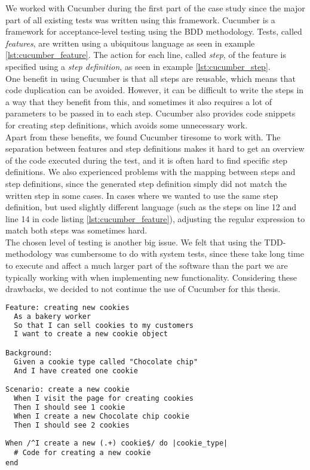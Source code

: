 
We worked with Cucumber during the first part of the case study since
the major part of all existing tests was written using this framework.
Cucumber is a framework for acceptance-level testing using the BDD
methodology. Tests, called \emph{features}, are written using a
ubiquitous language as seen in example \ref{lst:cucumber_feature}. The
action for each line, called \emph{step}, of the feature is specified
using a \emph{step definition}, as seen in example
\ref{lst:cucumber_step}. \cite{web:cucumber}\\

One benefit in using Cucumber is that all steps are reusable, which
means that code duplication can be avoided. However, it can be difficult
to write the steps in a way that they benefit from this, and sometimes
it also requires a lot of parameters to be passed in to each step.
Cucumber also provides code snippets for creating step definitions,
which avoids some unnecessary work.\\

Apart from these benefits, we found Cucumber tiresome to work with. The
separation between features and step definitions makes it hard to get an
overview of the code executed during the test, and it is often hard to
find specific step definitions. We also experienced problems with the
mapping between steps and step definitions, since the generated step
definition simply did not match the written step in some cases. In cases
where we wanted to use the same step definition, but used slightly
different language (such as the steps on line 12 and line 14 in code
listing \ref{lst:cucumber_feature}), adjusting the regular expression to
match both steps was sometimes hard.\\

The chosen level of testing is another big issue. We felt that using the
TDD-methodology was cumbersome to do with system tests, since these take
long time to execute and affect a much larger part of the software than
the part we are typically working with when implementing new
functionality. Considering these drawbacks, we decided to not continue
the use of Cucumber for this thesis.\\


\begin{lstlisting}[caption=Example of a Cucumber test.,
                   label=lst:cucumber_feature, float=t, language=HTML]
Feature: creating new cookies
  As a bakery worker
  So that I can sell cookies to my customers
  I want to create a new cookie object

Background:
  Given a cookie type called "Chocolate chip"
  And I have created one cookie

Scenario: create a new cookie
  When I visit the page for creating cookies
  Then I should see 1 cookie
  When I create a new Chocolate chip cookie
  Then I should see 2 cookies
\end{lstlisting}


\begin{lstlisting}[caption=Cucumber step definition for the step on row 13 in code listing \ref{lst:cucumber_feature}.,
                   label=lst:cucumber_step, float=t]
When /^I create a new (.+) cookie$/ do |cookie_type|
  # Code for creating a new cookie
end
\end{lstlisting}
